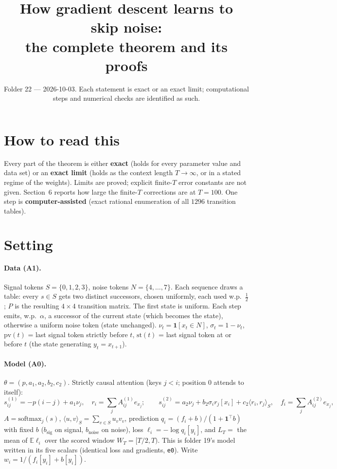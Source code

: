 \documentclass[11pt]{article}
\title{How gradient descent learns to skip noise:\\ the complete theorem and its proofs}
\author{Folder 22 --- 2026-10-03. Each statement is exact or an exact limit; computational\\
steps and numerical checks are identified as such.}
\date{}
\theoremstyle{definition}\newtheorem{assumption}{Assumption}\newtheorem{definition}{Definition}
\theoremstyle{remark}\newtheorem{remark}{Remark}
\newcommand{\1}{\mathbf{1}}\newcommand{\E}{\mathbb E}
\begin{document}
\maketitle

\section*{How to read this}
Every part of the theorem is either \textbf{exact} (holds for every parameter value and data set)
or an \textbf{exact limit} (holds as the context length $T\to\infty$, or in a stated regime of the
weights). Limits are proved; explicit finite-$T$ error constants are not given. Section~6 reports how
large the finite-$T$ corrections are at $T=100$. One step is \textbf{computer-assisted} (exact
rational enumeration of all $1296$ transition tables).

\section{Setting}
\paragraph{Data (A1).} Signal tokens $S=\{0,1,2,3\}$, noise tokens $N=\{4,\dots,7\}$. Each sequence draws a
table: every $s\in S$ gets two distinct successors, chosen uniformly, each used w.p.\ $\tfrac12$; $P$ is
the resulting $4\times4$ transition matrix. The first state is uniform. Each step emits, w.p.\ $\alpha$,
a successor of the current state (which becomes the state), otherwise a uniform noise token (state
unchanged). $\nu_t=\1[x_t\in N]$, $\sigma_t=1-\nu_t$, $\mathrm{pv}(t)$ = last signal token strictly
before $t$, $\mathrm{st}(t)$ = last signal token at or before $t$ (the state generating $y_t=x_{t+1}$).

\paragraph{Model (A0).} $\theta=(p,a_1,a_2,b_2,c_2)$. Strictly causal attention (keys $j<i$; position 0
attends to itself):
\[
s^{(1)}_{ij}=-p(i-j)+a_1\nu_j,\quad r_i=\textstyle\sum_jA^{(1)}_{ij}e_{x_j};\qquad
s^{(2)}_{ij}=a_2\nu_j+b_2\sigma_ir_j[x_i]+c_2\langle r_i,r_j\rangle_S,\quad f_i=\textstyle\sum_jA^{(2)}_{ij}e_{x_j},
\]
$A=\mathrm{softmax}_j(s)$, $\langle u,v\rangle_S=\sum_{v\in S}u_vv_v$, prediction $q_i=(f_i+b)/(1+\1^\top b)$ with
fixed $b$ ($b_{\mathrm{sig}}$ on signal, $b_{\mathrm{noise}}$ on noise), loss $\ell_i=-\log q_i[y_i]$, and
$L_T=$ the mean of $\E\ell_i$ over the scored window $W_T=[T/2,T)$. This is folder 19's model written
in its five scalars (identical loss and gradients, \texttt{e0}). Write $w_i=1/(f_i[y_i]+b[y_i])$.
\end{document}
